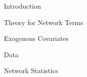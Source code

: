 \documentclass{beamer}
\begin{document}
\begin{frame}{Introduction}

\end{frame}

\begin{frame}{Theory for Network Terms}



\end{frame}

\begin{frame}{Exogenous Covariates}

 
\end{frame}



\begin{frame}{Data}


\end{frame}

\begin{frame}{Network Statistics}


\end{frame}
\end{document}

